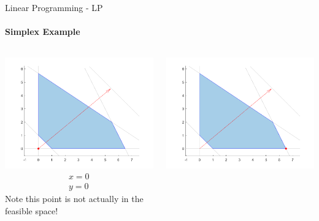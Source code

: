 \documentclass{beamer}
\begin{document}
	\begin{frame}{Linear Programming - LP}
		\framesubtitle{Simplex Example}
		\begin{columns}[T]
			\begin{column}{0.33\textwidth}
				\includegraphics[width=\textwidth]{images/slides_ex3_simplex1.png}
				\begin{align*}
					x = 0\\
					y = 0
				\end{align*}
				Note this point is not actually in the feasible space!
			\end{column}
			\begin{column}{0.33\textwidth}
				\includegraphics[width=\textwidth]{images/slides_ex3_simplex2.png}

\end{column}
\end{columns}
\end{frame}
\end{document}
